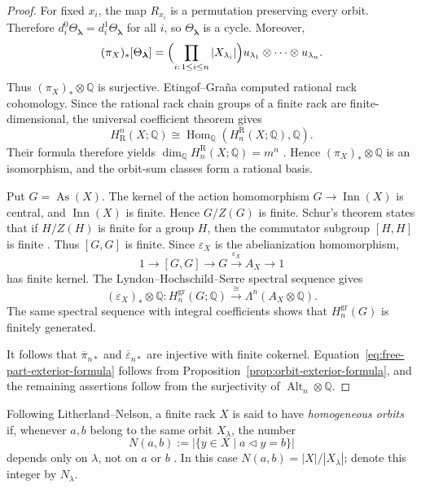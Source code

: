 \documentclass[10pt,a4paper]{amsart}
\DeclareMathOperator{\As}{As}
\DeclareMathOperator{\Inn}{Inn}
\newcommand{\QQ}{\mathbb Q}
\newcommand{\gr}{\mathrm{gr}}
\newcommand{\R}{\mathrm R}
\begin{document}
\begin{proof}
For fixed $x_i$, the map $R_{x_i}$ is a permutation preserving every orbit.
Therefore
$d_i^0\Theta_{\boldsymbol\lambda}=d_i^1\Theta_{\boldsymbol\lambda}$ for all
$i$, so $\Theta_{\boldsymbol\lambda}$ is a cycle. Moreover,
\[
(\pi_X)_*[\Theta_{\boldsymbol\lambda}]
 =\Bigl(\prod_{i:\,1\le i\le n}|X_{\lambda_i}|\Bigr)
 u_{\lambda_1}\otimes\cdots\otimes u_{\lambda_n}.
\]
Thus $(\pi_X)_*\otimes\QQ$ is surjective. Etingof--Gra\~na computed rational rack cohomology. Since the rational rack chain groups of a finite rack are
finite-dimensional, the universal coefficient theorem gives
\[
 H^n_\R(X;\QQ)
 \cong\operatorname{Hom}_{\QQ}(H_n^\R(X;\QQ),\QQ).
\]
Their formula therefore yields
$\dim_\QQ H_n^\R(X;\QQ)=m^n$
\cite[Theorem~4.2 and Corollary~4.3]{EtingofGrana}. Hence
$(\pi_X)_*\otimes\QQ$ is an isomorphism, and the orbit-sum classes form a
rational basis.

Put $G=\As(X)$. The kernel of the action homomorphism
$G\to\Inn(X)$ is central, and $\Inn(X)$ is finite. Hence $G/Z(G)$ is finite.
Schur's theorem states that if $H/Z(H)$ is finite for a group $H$, then the
commutator subgroup $[H,H]$ is finite
\cite[Theorem~10.1.4]{RobinsonGroupTheory}. Thus $[G,G]$ is finite. Since
$\varepsilon_X$ is the abelianization homomorphism,
\[
 1\longrightarrow [G,G]\longrightarrow G
 \xrightarrow{\varepsilon_X}A_X\longrightarrow1
\]
has finite kernel. The Lyndon--Hochschild--Serre spectral sequence gives
\cite[Chapter~VII, \S6]{Brown}
\[
 (\varepsilon_X)_*\otimes\QQ\colon
 H_n^{\gr}(G;\QQ)\xrightarrow{\cong}
 \Lambda^n(A_X\otimes\QQ).
\]
The same spectral sequence with integral coefficients shows that
$H_n^{\gr}(G)$ is finitely generated.

It follows that $\overline\pi_{n*}$ and $\overline\varepsilon_{n*}$ are
injective with finite cokernel. Equation~\eqref{eq:free-part-exterior-formula}
follows from Proposition~\ref{prop:orbit-exterior-formula}, and the remaining
assertions follow from the surjectivity of
$\operatorname{Alt}_n\otimes\QQ$.
\end{proof}


Following Litherland--Nelson, a finite rack $X$ is said to have
\emph{homogeneous orbits} if, whenever $a,b$ belong to the same orbit
$X_\lambda$, the number
\[
 N(a,b):=|\{y\in X\mid a\lhd y=b\}|
\]
depends only on $\lambda$, not on $a$ or $b$ \cite[\S1]{LitherlandNelson}.
In this case $N(a,b)=|X|/|X_\lambda|$; denote this integer by $N_\lambda$.
\end{document}
